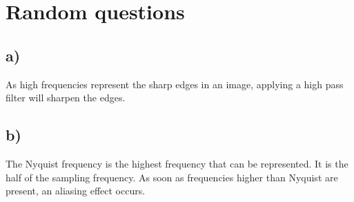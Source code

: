 \documentclass[a4paper]{scrartcl}
\begin{document}
\section{Random questions}
  \subsection*{a)}
    As high frequencies represent the sharp edges in an image, applying a high
    pass filter will sharpen the edges.

  \subsection*{b)}
    The Nyquist frequency is the highest frequency that can be represented. It
    is the half of the sampling frequency. As soon as frequencies higher than
    Nyquist are present, an aliasing effect occurs.
    
\end{document}
